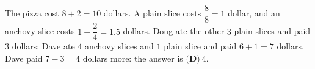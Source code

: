 The pizza cost $8+2=10$ dollars. A plain slice costs $\dfrac88=1$ dollar, and an anchovy slice costs $1+\dfrac24=1.5$ dollars. Doug ate the other $3$ plain slices and paid $3$ dollars; Dave ate $4$ anchovy slices and $1$ plain slice and paid $6+1=7$ dollars. Dave paid $7-3=4$ dollars more: the answer is $\boxed{\textbf{(D)}\ 4}$.
